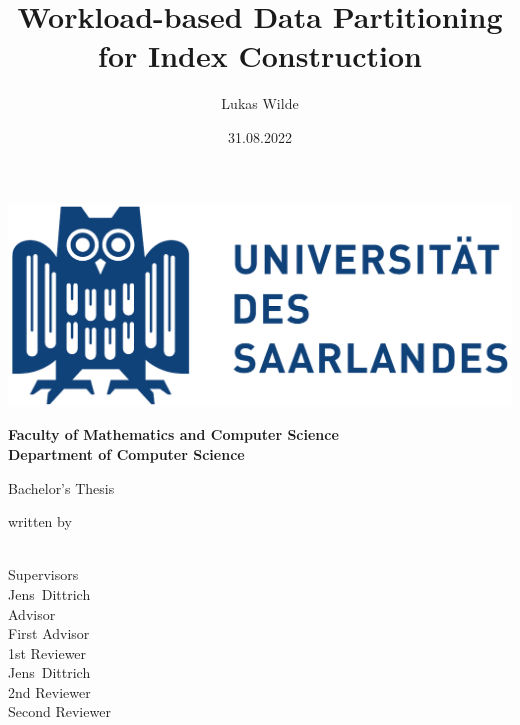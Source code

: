 \documentclass[11pt,a4paper,twoside,titlepage,british]{report}
\author{Lukas Wilde}
\date{31.08.2022}
\title{Workload-based Data Partitioning for Index Construction}
\makeatletter
\let\runauthor\@author
\let\runtitle\@title
\let\rundate\@date
\makeatother
\begin{document}
\begin{titlepage}
    \begin{center}
        \includegraphics[scale=.5]{figures/logo.pdf}

        \bfseries
        \vspace{2em}
        Faculty of Mathematics and Computer Science \\
        Department of Computer Science

        \vspace{2cm}
        \begin{doublespace}
            {\LARGE \runtitle}
        \end{doublespace}

        \vspace{1cm} 
        {\large Bachelor's Thesis}

        \vfill
        {\normalfont written by}
        \\[1em]
        {\Large \runauthor}
        \\[1em]
        \textbf{\printdate{\rundate}}

        \vfill
        {\normalfont Supervisors}
        \\
        {\large Jens~Dittrich}
        \\[.5em]
        {\normalfont Advisor}
        \\
        {\large First Advisor}
        \\[.5em]
        {\normalfont 1st Reviewer}
        \\
        {\large Jens~Dittrich}
        \\[.5em]
        {\normalfont 2nd Reviewer}
        \\
        {\large Second Reviewer}
    \end{center}
\end{titlepage}
\setcounter{page}{2}

\end{document}
